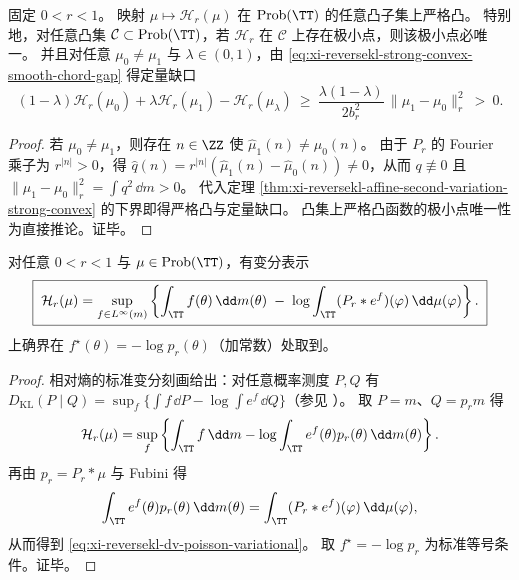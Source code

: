 \begin{corollary}[凸约束下的唯一极小与可证伪稳定缺口]\label{cor:xi-reversekl-strict-convex-unique-minimizer}
固定 \(0<r<1\)。
映射 \(\mu\mapsto \mathcal H_r(\mu)\) 在 \(\mathrm{Prob}(\TT)\) 的任意凸子集上严格凸。
特别地，对任意凸集 \(\mathcal C\subset \mathrm{Prob}(\TT)\)，若 \(\mathcal H_r\) 在 \(\mathcal C\) 上存在极小点，则该极小点必唯一。
并且对任意 \(\mu_0\neq\mu_1\) 与 \(\lambda\in(0,1)\)，由 \eqref{eq:xi-reversekl-strong-convex-smooth-chord-gap} 得定量缺口
\[
(1-\lambda)\mathcal H_r(\mu_0)+\lambda\mathcal H_r(\mu_1)-\mathcal H_r(\mu_\lambda)
\ \ge\
\frac{\lambda(1-\lambda)}{2b_r^2}\,\|\mu_1-\mu_0\|_r^2\ >\ 0.
\]
\end{corollary}
\begin{proof}
若 \(\mu_0\neq \mu_1\)，则存在 \(n\in\ZZ\) 使 \(\widehat\mu_1(n)\neq \widehat\mu_0(n)\)。
由于 \(P_r\) 的 Fourier 乘子为 \(r^{|n|}>0\)，得 \(\widehat q(n)=r^{|n|}(\widehat\mu_1(n)-\widehat\mu_0(n))\neq 0\)，从而 \(q\not\equiv 0\) 且 \(\|\mu_1-\mu_0\|_r^2=\int q^2\,\dd m>0\)。
代入定理 \ref{thm:xi-reversekl-affine-second-variation-strong-convex} 的下界即得严格凸与定量缺口。
凸集上严格凸函数的极小点唯一性为直接推论。证毕。
\end{proof}

\begin{theorem}\label{thm:xi-reversekl-dv-poisson-variational}
对任意 \(0<r<1\) 与 \(\mu\in\mathrm{Prob}(\TT)\)，有变分表示
\begin{equation}\label{eq:xi-reversekl-dv-poisson-variational}
\boxed{\;
\mathcal H_r(\mu)
=\sup_{f\in L^\infty(m)}
\left\{\int_{\TT} f(\theta)\,\dd m(\theta)\;-\;\log\int_{\TT}(P_r*e^{f})(\varphi)\,\dd\mu(\varphi)\right\}.
\;}
\end{equation}
上确界在 \(f^\star(\theta)=-\log p_r(\theta)\)（加常数）处取到。
\end{theorem}
\begin{proof}
相对熵的标准变分刻画给出：对任意概率测度 \(P,Q\) 有
\(
D_{\mathrm{KL}}(P\mid Q)=\sup_f\{\int f\,\dd P-\log\int e^f\,\dd Q\}
\)（参见 \cite{CoverThomas2006}）。
取 \(P=m\)、\(Q=p_r m\) 得
\[
\mathcal H_r(\mu)=\sup_f\left\{\int_{\TT} f\,\dd m-\log\int_{\TT}e^f(\theta)p_r(\theta)\,\dd m(\theta)\right\}.
\]
再由 \(p_r=P_r*\mu\) 与 Fubini 得
\[
\int_{\TT}e^f(\theta)p_r(\theta)\,\dd m(\theta)
=\int_{\TT}(P_r*e^f)(\varphi)\,\dd\mu(\varphi),
\]
从而得到 \eqref{eq:xi-reversekl-dv-poisson-variational}。
取 \(f^\star=-\log p_r\) 为标准等号条件。证毕。
\end{proof}

